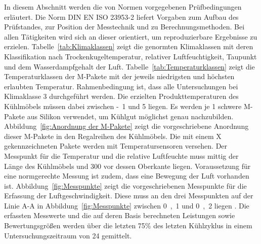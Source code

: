 In diesem Abschnitt werden die von Normen vorgegebenen Prüfbedingungen erläutert.
Die Norm DIN EN ISO 23953-2 liefert Vorgaben zum Aufbau des Prüfstandes, zur Position der Messtechnik und zu Berechnungsmethoden. Bei allen Tätigkeiten wird sich an dieser orientiert, um reproduzierbare Ergebnisse zu erzielen.
Tabelle~\ref{tab:Klimaklassen} zeigt die genormten Klimaklassen mit deren Klassifikation nach Trockenkugeltemperatur, relativer Luftfeuchtigkeit, Taupunkt und dem Wasserdampfgehalt der Luft. Tabelle~\ref{tab:Temperaturklassen} zeigt die Temperaturklassen der M-Pakete mit der jeweils niedrigsten und höchsten erlaubten Temperatur. Rahmenbedingung ist, dass alle Untersuchungen bei Klimaklasse 3 durchgeführt werden. Die erzielten Produkttemperaturen des Kühlmöbels müssen dabei zwischen \unit{-1}{\celsius} und \unit{5}{\celsius} liegen. \newline
Es werden je \unit{1}{\kilogram} schwere M-Pakete aus Silikon verwendet, um Kühlgut möglichst genau nachzubilden. Abbildung~\ref{fig:Anordnung der M-Pakete} zeigt die vorgeschriebene Anordnung dieser M-Pakete in den Regalreihen des Kühlmöbels. Die mit einem X gekennzeichneten Pakete werden mit Temperatursensoren versehen.
Der Messpunkt für die Temperatur und die relative Luftfeuchte muss mittig der Länge des Kühlmöbels und \unit{300}{\milli\metre} vor dessen Oberkante liegen. \newline
Voraussetzung für eine normgerechte Messung ist zudem, dass eine Bewegung der Luft vorhanden ist. Abbildung~\ref{fig:Messpunkte} zeigt die vorgeschriebenen Messpunkte für die Erfassung der Luftgeschwindigkeit. Diese muss an den drei Messpunkten auf der Linie A-A in Abbildung~\ref{fig:Messpunkte} zwischen \unit{0,1}{\meter\per\second} und \unit{0,2}{\meter\per\second} liegen \cite{DINDeutschesInstitutfurNormunge.V..}. \newline
Die erfassten Messwerte und die auf deren Basis berechneten Leistungen sowie Bewertungsgrößen werden über die letzten \unit{75}{\%} des letzten Kühlzyklus in einem Untersuchungszeitraum von \unit{24}{\hour} gemittelt.





